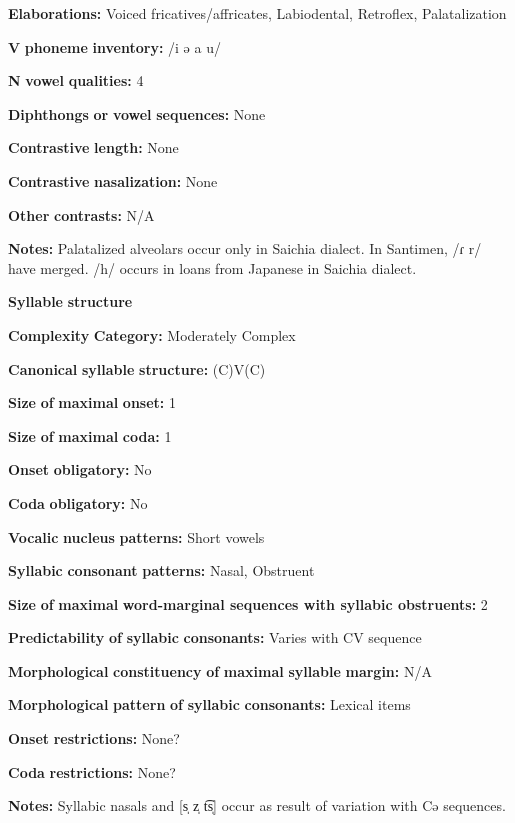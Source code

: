 \textbf{Elaborations:} Voiced fricatives/affricates, Labiodental, Retroflex, Palatalization

\textbf{V} \textbf{phoneme} \textbf{inventory:} /i ə a u/

\textbf{N} \textbf{vowel} \textbf{qualities:} 4

\textbf{Diphthongs} \textbf{or} \textbf{vowel} \textbf{sequences:} None

\textbf{Contrastive} \textbf{length:} None

\textbf{Contrastive} \textbf{nasalization:} None

\textbf{Other} \textbf{contrasts:} N/A

\textbf{Notes:} Palatalized alveolars occur only in Saichia dialect. In Santimen, /ɾ r/ have merged. /h/ occurs in loans from Japanese in Saichia dialect.

\textbf{Syllable} \textbf{structure}

\textbf{Complexity} \textbf{Category:} Moderately Complex

\textbf{Canonical} \textbf{syllable} \textbf{structure:} (C)V(C) \citep[31-34]{Chang2006}

\textbf{Size} \textbf{of} \textbf{maximal} \textbf{onset:} 1

\textbf{Size} \textbf{of} \textbf{maximal} \textbf{coda:} 1

\textbf{Onset} \textbf{obligatory:} No

\textbf{Coda} \textbf{obligatory:} No

\textbf{Vocalic} \textbf{nucleus} \textbf{patterns:} Short vowels

\textbf{Syllabic} \textbf{consonant} \textbf{patterns:} Nasal, Obstruent

\textbf{Size} \textbf{of} \textbf{maximal} \textbf{word{}-marginal sequences with syllabic obstruents:} 2

\textbf{Predictability} \textbf{of} \textbf{syllabic} \textbf{consonants:} Varies with CV sequence

\textbf{Morphological} \textbf{constituency} \textbf{of} \textbf{maximal} \textbf{syllable} \textbf{margin:} N/A

\textbf{Morphological} \textbf{pattern} \textbf{of} \textbf{syllabic} \textbf{consonants:} Lexical items

\textbf{Onset} \textbf{restrictions:} None?

\textbf{Coda} \textbf{restrictions:} None?

\textbf{Notes:} Syllabic nasals and [s̩ z̩ t͡s̩] occur as result of variation with Cə sequences.

